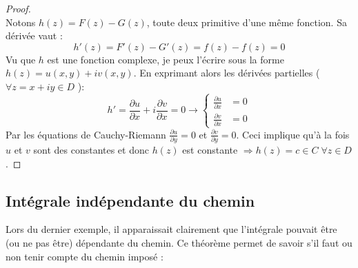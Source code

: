 \begin{proof}\ \\
	Notons $h(z) = F(z) - G(z)$, toute deux primitive d'une même fonction. Sa dérivée
	vaut :
	\begin{equation}
		h'(z) =  F'(z) - G'(z) = f(z) - f(z) = 0
	\end{equation}
	Vu que $h$ est une fonction complexe, je peux l'écrire sous la forme $h(z) = 
	u(x,y) + iv(x,y)$. En exprimant alors les dérivées partielles ($\forall z =
	x + iy \in D$ ):
	\begin{equation}
		h' = \frac{\partial u}{\partial x} + i\frac{\partial v}{\partial x} = 0 \rightarrow
		\left\{\begin{array}{ll}
		\frac{\partial u}{\partial x} &= 0  \\
		\frac{\partial v}{\partial x} &= 0 
		\end{array}\right.
	\end{equation}
	Par les équations de Cauchy-Riemann $\frac{\partial u}{\partial y} =0$ et 
	$\frac{\partial v}{\partial y} = 0$. Ceci implique qu'à la fois $u$ et $v$ sont
	des constantes et donc $h(z)$ est constante $\Rightarrow h(z) = c \in C \; \forall
	z \in D$.
\end{proof}
    
\subsection{Intégrale indépendante du chemin}
Lors du dernier exemple, il apparaissait clairement que l'intégrale pouvait être
(ou ne pas être) dépendante du chemin. Ce théorème permet de savoir s'il faut ou
non tenir compte du chemin imposé :\\
    
    
